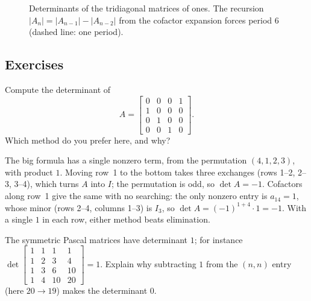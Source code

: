 \begin{figure}[ht]
  \centering
  \caption{Determinants of the tridiagonal matrices of ones. The recursion
  $|A_n|=|A_{n-1}|-|A_{n-2}|$ from the cofactor expansion forces period $6$ (dashed line: one
  period).}
  \label{fig:u21-period}
\end{figure}

\subsection{Exercises}

\begin{exercise}\label{ex:u21-cycle}
Compute the determinant of
\[
  A=\begin{bmatrix}0&0&0&1\\1&0&0&0\\0&1&0&0\\0&0&1&0\end{bmatrix}.
\]
Which method do you prefer here, and why?
\end{exercise}

\begin{solution}
The big formula has a single nonzero term, from the permutation $(4,1,2,3)$, with product
$1$. Moving row~1 to the bottom takes three exchanges (rows 1--2, 2--3, 3--4), which turns $A$
into $I$; the permutation is odd, so $\det A=-1$. Cofactors along row~1 give the same with no
searching: the only nonzero entry is $a_{14}=1$, whose minor (rows 2--4, columns 1--3) is $I_3$,
so $\det A=(-1)^{1+4}\cdot 1=-1$. With a single $1$ in each row, either method beats
elimination.
\end{solution}

\begin{exercise}\label{ex:u21-pascal}
The symmetric Pascal matrices have determinant $1$; for instance
$\det\left[\begin{smallmatrix}1&1&1&1\\1&2&3&4\\1&3&6&10\\1&4&10&20\end{smallmatrix}\right]=1$.
Explain why subtracting $1$ from the $(n,n)$ entry (here $20\to 19$) makes the determinant
$0$.
\end{exercise}

